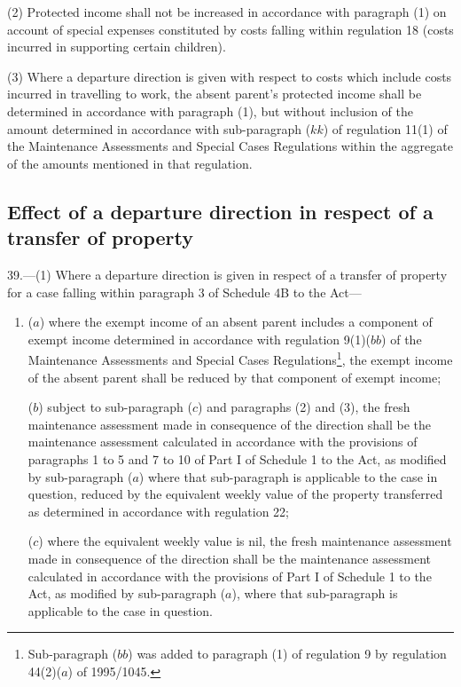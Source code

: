 \documentclass[a4paper]{article}
\begin{document}
(2) Protected income shall not be increased in accordance with paragraph (1) on
account of special expenses constituted by costs falling within regulation 18
(costs incurred in supporting certain children).

(3) Where a departure direction is given with respect to costs which include
costs incurred in travelling to work, the absent parent’s protected income shall
be determined in accordance with paragraph (1), but without inclusion of the
amount determined in accordance with sub-paragraph ($kk$) of regulation 11(1) of
the Maintenance Assessments and Special Cases Regulations within the aggregate
of the amounts mentioned in that regulation.

\subsection[39. Effect of a departure direction in respect of a transfer of property]{Effect of a departure direction in respect of a transfer of property}

39.—(1)
Where a departure direction is given in respect of a transfer of property for a
case falling within paragraph 3 of Schedule 4B to the Act—
\begin{enumerate}\item[]
($a$) where the exempt income of an absent parent includes a component of exempt
income determined in accordance with regulation 9(1)($bb$) of the Maintenance
Assessments and Special Cases Regulations\footnote{\frenchspacing Sub-paragraph ($bb$) was added to paragraph (1) of regulation 9 by regulation 44(2)($a$) of 1995/1045.}, the exempt income of the absent
parent shall be reduced by that component of exempt income;

($b$) subject to sub-paragraph ($c$) and paragraphs (2) and (3), the fresh
maintenance assessment made in consequence of the direction shall be the
maintenance assessment calculated in accordance with the provisions of
paragraphs 1 to 5 and 7 to 10 of Part I of Schedule 1 to the Act, as modified by
sub-paragraph ($a$) where that sub-paragraph is applicable to the case in
question, reduced by the equivalent weekly value of the property transferred as
determined in accordance with regulation 22;

($c$) where the equivalent weekly value is nil, the fresh maintenance assessment
made in consequence of the direction shall be the maintenance assessment
calculated in accordance with the provisions of Part I of Schedule 1 to the Act,
as modified by sub-paragraph ($a$), where that sub-paragraph is applicable to the
case in question.
\end{enumerate}
\end{document}
